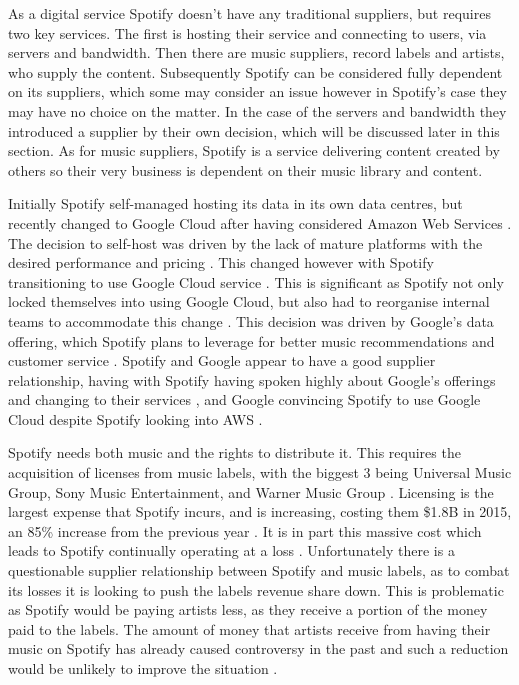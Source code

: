 \par
As a digital service Spotify doesn't have any traditional suppliers, but requires two key services. The first is hosting their service and connecting to users, via servers and bandwidth. Then there are music suppliers, record labels and artists, who supply the content. Subsequently Spotify can be considered fully dependent on its suppliers, which some may consider an issue \parencite{dependent_on_suppliers} however in Spotify's case they may have no choice on the matter. In the case of the servers and bandwidth they introduced a supplier by their own decision, which will be discussed later in this section. As for music suppliers, Spotify is a service delivering content created by others so their very business is dependent on their music library and content.
\par 
Initially Spotify self-managed hosting its data in its own data centres, but recently changed to Google Cloud after having considered Amazon Web Services \parencite{siliconangle_spotify_google_cloud, google_lures_spotify}. The decision to self-host was driven by the lack of mature platforms with the desired performance and pricing \parencite{siliconangle_spotify_google_cloud}. This changed however with Spotify transitioning to use Google Cloud service \parencite{siliconangle_spotify_google_cloud, spotify_announce_google_cloud}. This is significant as Spotify not only locked themselves into using Google Cloud, but also had to reorganise internal teams to accommodate this change \parencite{forbes_why_spotify_google_cloud}. This decision was driven by Google's data offering, which Spotify plans to leverage for better music recommendations and customer service \parencite{forbes_why_spotify_google_cloud, spotify_announce_google_cloud}. Spotify and Google appear to have a good supplier relationship, having with Spotify having spoken highly about Google's offerings and changing to their services \parencite{spotify_announce_google_cloud}, and Google convincing Spotify to use Google Cloud despite Spotify looking into AWS \parencite{google_lures_spotify}.
\par 
Spotify needs both music and the rights to distribute it. This requires the acquisition of licenses from music labels, with the biggest 3 being Universal Music Group, Sony Music Entertainment, and Warner Music Group \parencite{spotify_lapsed_music_labels}. Licensing is the largest expense that Spotify incurs, and is increasing, costing them \$1.8B in 2015, an 85\% increase from the previous year \parencite{broken_music_industry}. It is in part this massive cost which leads to Spotify continually operating at a loss \parencite{spotify_losses}. Unfortunately there is a questionable supplier relationship between Spotify and music labels, as to combat its losses it is looking to push the labels revenue share down. This is problematic as Spotify would be paying artists less, as they receive a portion of the money paid to the labels. The amount of money that artists receive from having their music on Spotify has already caused controversy in the past and such a reduction would be unlikely to improve the situation \parencite{guardian_swift, spotify_lapsed_music_labels}.